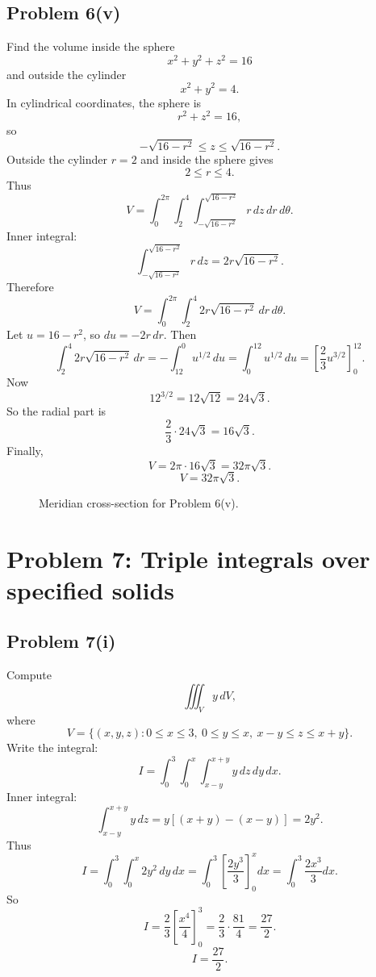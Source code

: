 \documentclass[11pt,a4paper]{article}
\begin{document}
\subsection{Problem 6(v)}
Find the volume inside the sphere
\[
 x^2+y^2+z^2=16
\]
and outside the cylinder
\[
 x^2+y^2=4.
\]
In cylindrical coordinates, the sphere is
\[
 r^2+z^2=16,
\]
so
\[
 -\sqrt{16-r^2}\le z\le\sqrt{16-r^2}.
\]
Outside the cylinder \(r=2\) and inside the sphere gives
\[
 2\le r\le4.
\]
Thus
\[
 V=\int_0^{2\pi}\int_2^4\int_{-\sqrt{16-r^2}}^{\sqrt{16-r^2}}r\,dz\,dr\,d\theta.
\]
Inner integral:
\[
 \int_{-\sqrt{16-r^2}}^{\sqrt{16-r^2}}r\,dz
 =2r\sqrt{16-r^2}.
\]
Therefore
\[
 V=\int_0^{2\pi}\int_2^4 2r\sqrt{16-r^2}\,dr\,d\theta.
\]
Let \(u=16-r^2\), so \(du=-2r\,dr\).  Then
\[
 \int_2^4 2r\sqrt{16-r^2}\,dr
 =-\int_{12}^{0}u^{1/2}\,du
 =\int_0^{12}u^{1/2}\,du
 =\left[\frac23u^{3/2}\right]_0^{12}.
\]
Now
\[
 12^{3/2}=12\sqrt{12}=24\sqrt3.
\]
So the radial part is
\[
 \frac23\cdot24\sqrt3=16\sqrt3.
\]
Finally,
\[
 V=2\pi\cdot16\sqrt3=32\pi\sqrt3.
\]
\[
\boxed{V=32\pi\sqrt3.}
\]

\begin{figure}[H]
\centering
{}
\caption{Meridian cross-section for Problem 6(v).}
\end{figure}

\section{Problem 7: Triple integrals over specified solids}

\subsection{Problem 7(i)}
Compute
\[
 \iiint_V y\,dV,
\]
where
\[
 V=\{(x,y,z):0\le x\le3,
\ 0\le y\le x,
\ x-y\le z\le x+y\}.
\]
Write the integral:
\[
 I=\int_0^3\int_0^x\int_{x-y}^{x+y}y\,dz\,dy\,dx.
\]
Inner integral:
\[
 \int_{x-y}^{x+y}y\,dz=y[(x+y)-(x-y)]=2y^2.
\]
Thus
\[
 I=\int_0^3\int_0^x2y^2\,dy\,dx
 =\int_0^3\left[\frac{2y^3}{3}\right]_0^x dx
 =\int_0^3\frac{2x^3}{3}dx.
\]
So
\[
 I=\frac23\left[\frac{x^4}{4}\right]_0^3
 =\frac23\cdot\frac{81}{4}
 =\frac{27}{2}.
\]
\[
\boxed{I=\frac{27}{2}.}
\]
\end{document}
